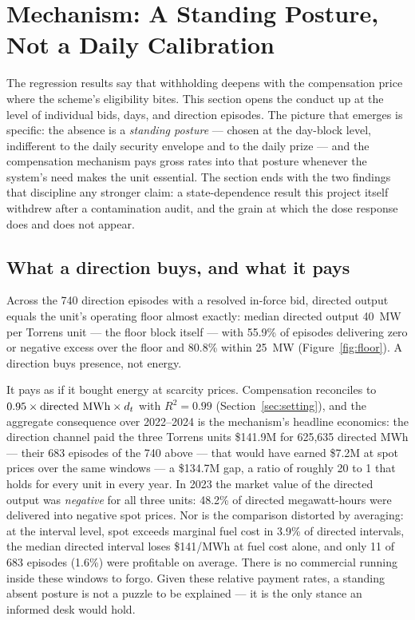 \section{Mechanism: A Standing Posture, Not a Daily Calibration}\label{sec:mechanism}

The regression results say that withholding deepens with the compensation
price where the scheme's eligibility bites. This section opens the conduct up
at the level of individual bids, days, and direction episodes. The picture
that emerges is specific: the absence is a \emph{standing posture} --- chosen
at the day-block level, indifferent to the daily security envelope and to the
daily prize --- and the compensation mechanism pays gross rates into that
posture whenever the system's need makes the unit essential. The section ends
with the two findings that discipline any stronger claim: a state-dependence
result this project itself withdrew after a contamination audit, and the
grain at which the dose response does and does not appear.

\subsection{What a direction buys, and what it pays}

Across the 740 direction episodes with a resolved in-force bid, directed
output equals the unit's operating floor almost exactly: median directed
output 40~MW per Torrens unit --- the floor block itself --- with 55.9\% of
episodes delivering zero or negative excess over the floor and 80.8\% within
25~MW (Figure~\ref{fig:floor}). A direction buys presence, not energy.

It pays as if it bought energy at scarcity prices. Compensation reconciles to
$0.95 \times \text{directed MWh} \times d_t$ with $R^{2}=0.99$
(Section~\ref{sec:setting}), and the aggregate consequence over 2022--2024 is
the mechanism's headline economics: the direction channel paid the three
Torrens units \$141.9M for 625,635 directed MWh --- their 683 episodes of
the 740 above --- that would have earned \$7.2M
at spot prices over the same windows --- a \$134.7M gap, a ratio of roughly
20 to 1 that holds for every unit in every year. In 2023 the market value of the directed output
was \emph{negative} for all three units: 48.2\% of directed megawatt-hours
were delivered into negative spot prices. Nor is the comparison distorted by
averaging: at the interval level, spot exceeds marginal fuel cost in 3.9\% of
directed intervals, the median directed interval loses \$141/MWh at fuel cost
alone, and only 11 of 683 episodes (1.6\%) were profitable on average. There
is no commercial running inside these windows to forgo. Given these relative
payment rates, a standing absent posture is not a puzzle to be explained ---
it is the only stance an informed desk would hold.

